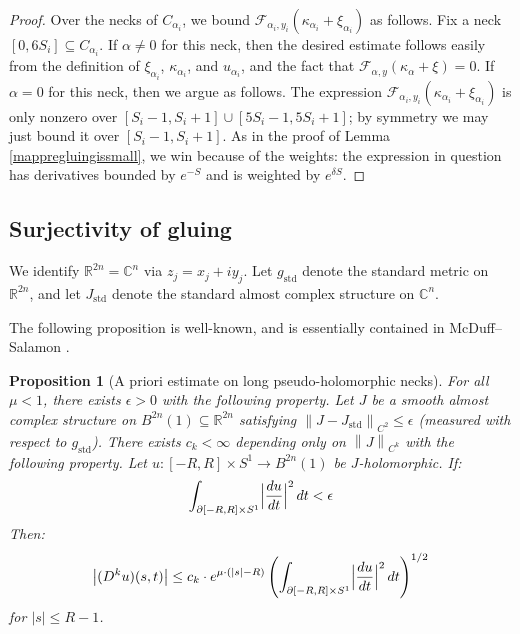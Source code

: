 \documentclass[12pt]{article}
\newtheorem{proposition}[theorem]{Proposition}
\theoremstyle{definition}
\theoremstyle{remark}
\numberwithin{equation}{subsection}
\newcommand{\F}{\mathcal F}
\newcommand{\CC}{\mathbb C}
\newcommand{\RR}{\mathbb R}
\newcommand{\std}{\mathrm{std}}
\begin{document}
\begin{proof}
Over the necks of $C_{\alpha_i}$, we bound $\F_{\alpha_i,y_i}(\kappa_{\alpha_i}+\xi_{\alpha_i})$ as follows.  Fix a neck $[0,6S_i]\subseteq C_{\alpha_i}$.  If $\alpha\ne 0$ for this neck, then the desired estimate follows easily from the definition of $\xi_{\alpha_i}$, $\kappa_{\alpha_i}$, and $u_{\alpha_i}$, and the fact that $\F_{\alpha,y}(\kappa_\alpha+\xi)=0$.  If $\alpha=0$ for this neck, then we argue as follows.  The expression $\F_{\alpha_i,y_i}(\kappa_{\alpha_i}+\xi_{\alpha_i})$ is only nonzero over $[S_i-1,S_i+1]\cup[5S_i-1,5S_i+1]$; by symmetry we may just bound it over $[S_i-1,S_i+1]$.  As in the proof of Lemma \ref{mappregluingissmall}, we win because of the weights: the expression in question has derivatives bounded by $e^{-S}$ and is weighted by $e^{\delta S}$.
\end{proof}

\subsection{Surjectivity of gluing}

We identify $\RR^{2n}=\CC^n$ via $z_j=x_j+iy_j$.  Let $g_\std$ denote the standard metric on $\RR^{2n}$, and let $J_\std$ denote the standard almost complex structure on $\CC^n$.

The following proposition is well-known, and is essentially contained in McDuff--Salamon \cite{mcduffsalamonJholsymp}.

\begin{proposition}[A priori estimate on long pseudo-holomorphic necks]\label{neckestimate}
For all $\mu<1$, there exists $\epsilon>0$ with the following property.  Let $J$ be a smooth almost complex structure on $B^{2n}(1)\subseteq\RR^{2n}$ satisfying $\left\|J-J_\std\right\|_{C^2}\leq\epsilon$ (measured with respect to $g_\std$).  There exists $c_k<\infty$ depending only on $\left\|J\right\|_{C^k}$ with the following property.  Let $u:[-R,R]\times S^1\to B^{2n}(1)$ be $J$-holomorphic.  If:
\begin{equation}
\int_{\partial[-R,R]\times S^1}\Bigl|\frac{du}{dt}\Bigr|^2\,dt<\epsilon
\end{equation}
Then:
\begin{equation}
\left|(D^ku)(s,t)\right|\leq c_k\cdot e^{\mu\cdot(\left|s\right|-R)}\left(\int_{\partial[-R,R]\times S^1}\Bigl|\frac{du}{dt}\Bigr|^2\,dt\right)^{1/2}
\end{equation}
for $\left|s\right|\leq R-1$.
\end{proposition}
\end{document}
